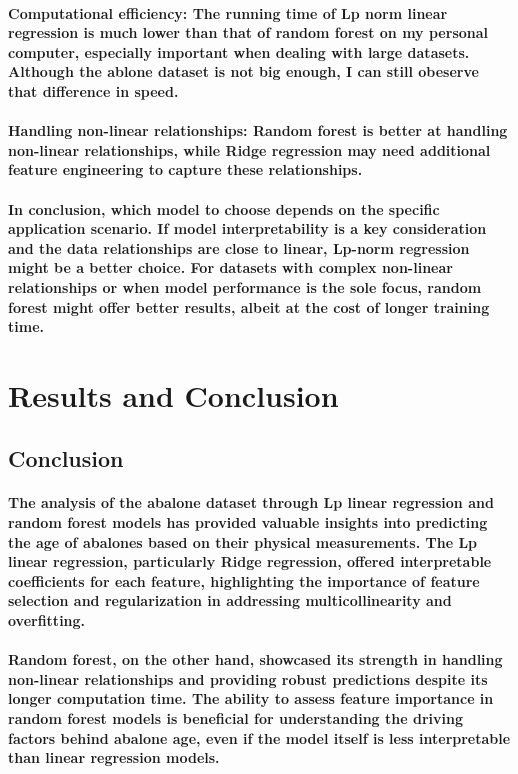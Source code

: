 \documentclass[11pt]{article} %
\begin{document}
\paragraph{\textbf{Computational efficiency}: The running time of Lp norm linear regression is much lower than that of random forest on my personal computer, especially important when dealing with large datasets. Although the ablone dataset is not big enough, I can still obeserve that difference in speed.}
\paragraph{\textbf{Handling non-linear relationships}: Random forest is better at handling non-linear relationships, while Ridge regression may need additional feature engineering to capture these relationships.
}
\paragraph{In conclusion, which model to choose depends on the specific application scenario. If model interpretability is a key consideration and the data relationships are close to linear, Lp-norm regression might be a better choice. For datasets with complex non-linear relationships or when model performance is the sole focus, random forest might offer better results, albeit at the cost of longer training time.}
% 
% 
% 
% 
\section{Results and Conclusion}
% 
% 
% 
\subsection{Conclusion}
\paragraph{The analysis of the abalone dataset through Lp linear regression and random forest models has provided valuable insights into predicting the age of abalones based on their physical measurements. The Lp linear regression, particularly Ridge regression, offered interpretable coefficients for each feature, highlighting the importance of feature selection and regularization in addressing multicollinearity and overfitting.}
\paragraph{Random forest, on the other hand, showcased its strength in handling non-linear relationships and providing robust predictions despite its longer computation time. The ability to assess feature importance in random forest models is beneficial for understanding the driving factors behind abalone age, even if the model itself is less interpretable than linear regression models.}
% 
% 
% 
\end{document}
